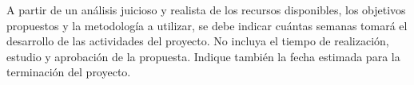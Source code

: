 \documentclass[../Main.tex]{subfiles}
\begin{document}
A partir de un análisis juicioso y realista de los recursos disponibles, los objetivos propuestos y la
metodología a utilizar, se debe indicar cuántas semanas tomará el desarrollo de las actividades del
proyecto. No incluya el tiempo de realización, estudio y aprobación de la propuesta. Indique
también la fecha estimada para la terminación del proyecto.
\begin{center}
\begin{table}[H]
\end{table}

\end{center}
\end{document}
